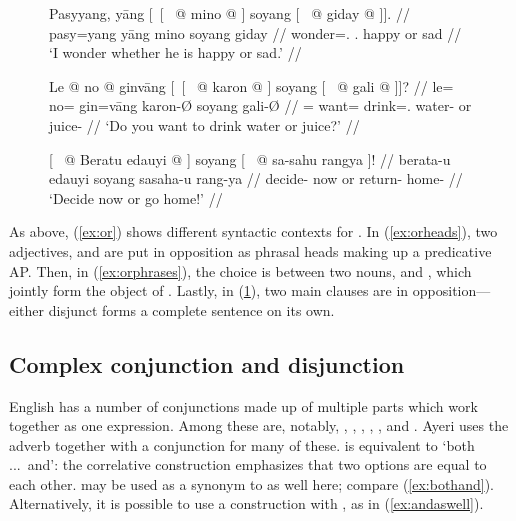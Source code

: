 \begin{figure}[h]
\pex\label{ex:or}
\a\label{ex:orheads}\begingl
	\gla Pasyyang, yāng \textup{[~[~} @ mino @ 
		\textup{]} soyang \textup{[~} @ giday @ 
		\textup{]].} //
	\glb pasy=yang yāng {} mino {} soyang {} giday {} //
	\glc wonder=\Fsg{}.\Aarg{} \TsgM{}.\Aarg{} {} happy {} or {} sad {} //
	\glft `I wonder whether he is happy or sad.' //
\endgl

\a\label{ex:orphrases}\begingl
	\gla Le @ no @ ginvāng \textup{[~[~} @ karon @ \textup{]} 
		soyang \textup{[~} @ gali @ \textup{]]?} //
	\glb le= no= gin=vāng {} karon-Ø {} soyang {} gali-Ø {} //
	\glc \PatTI{}= want= drink=\Second{}.\Aarg{} {} water-\Top{} {} or {} 
		juice-\Top{} {} //
	\glft `Do you want to drink water or juice?' //
\endgl

\a\label{ex:orclauses}\begingl
	\gla \textup{[~} @ Beratu edauyi @ \textup{]} soyang
		\textup{[~} @ sa-sahu rangya \textup{]!} //
	\glb {} berata-u edauyi {} soyang {} sa\til{}saha-u rang-ya {} //
	\glc {} decide-\Imp{} now {} or {} return-\Imp{} home-\Loc{} {} //
	\glft `Decide now or go home!' //
\endgl
\xe
\end{figure}

As above, (\ref{ex:or}) shows different syntactic contexts for 
. In (\ref{ex:orheads}), two adjectives, 
 and  are put in opposition as
phrasal heads making up a predicative AP. Then, in (\ref{ex:orphrases}), the
choice is between two nouns,  and
, which jointly form the object of
. Lastly, in (\ref{ex:orclauses}), two main 
clauses are in opposition---either disjunct forms a complete sentence on its 
own.


\subsection{Complex conjunction and disjunction}
\label{subsec:corrconj}

English has a number of conjunctions made up of multiple parts which work
together as one expression. Among these are, notably,
,
,
,
,
, and
.
Ayeri uses the adverb  together with a
conjunction for many of these. 
is equivalent to `both ...\ and': the correlative construction emphasizes that
two options are equal to each other.  may be used as a
synonym to  as well here; compare (\ref{ex:bothand}).
Alternatively, it is possible to use a construction with
, as in (\ref{ex:andaswell}).

